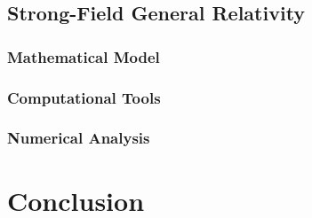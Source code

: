 \documentclass{report}
\begin{document}
    \section{Strong-Field General Relativity}

        \subsection{Mathematical Model}

        \subsection{Computational Tools}

        \subsection{Numerical Analysis}

\chapter{Conclusion}

\printbibliography

\printindex
\end{document}
